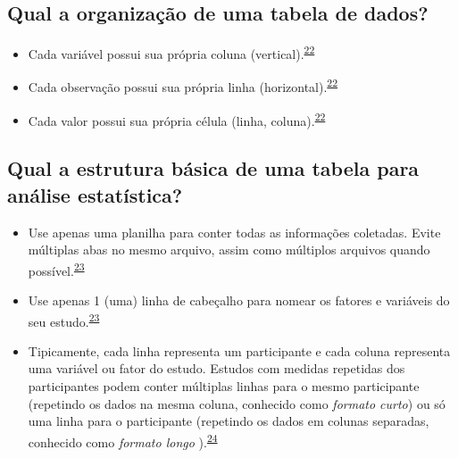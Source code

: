 \documentclass[
]{book}
\begin{document}
\hypertarget{qual-a-organizauxe7uxe3o-de-uma-tabela-de-dados}{%
\subsection{Qual a organização de uma tabela de dados?}\label{qual-a-organizauxe7uxe3o-de-uma-tabela-de-dados}}

\begin{itemize}
\item
  Cada variável possui sua própria coluna (vertical).\textsuperscript{\protect\hyperlink{ref-tierney2023}{22}}
\item
  Cada observação possui sua própria linha (horizontal).\textsuperscript{\protect\hyperlink{ref-tierney2023}{22}}
\item
  Cada valor possui sua própria célula (linha, coluna).\textsuperscript{\protect\hyperlink{ref-tierney2023}{22}}
\end{itemize}

\hypertarget{qual-a-estrutura-buxe1sica-de-uma-tabela-para-anuxe1lise-estatuxedstica}{%
\subsection{Qual a estrutura básica de uma tabela para análise estatística?}\label{qual-a-estrutura-buxe1sica-de-uma-tabela-para-anuxe1lise-estatuxedstica}}

\begin{itemize}
\item
  Use apenas uma planilha para conter todas as informações coletadas. Evite múltiplas abas no mesmo arquivo, assim como múltiplos arquivos quando possível.\textsuperscript{\protect\hyperlink{ref-broman2018}{23}}
\item
  Use apenas 1 (uma) linha de cabeçalho para nomear os fatores e variáveis do seu estudo.\textsuperscript{\protect\hyperlink{ref-broman2018}{23}}
\item
  Tipicamente, cada linha representa um participante e cada coluna representa uma variável ou fator do estudo. Estudos com medidas repetidas dos participantes podem conter múltiplas linhas para o mesmo participante (repetindo os dados na mesma coluna, conhecido como \emph{formato curto}) ou só uma linha para o participante (repetindo os dados em colunas separadas, conhecido como \emph{formato longo} ).\textsuperscript{\protect\hyperlink{ref-Juluru2015}{24}}
\end{itemize}
\end{document}
